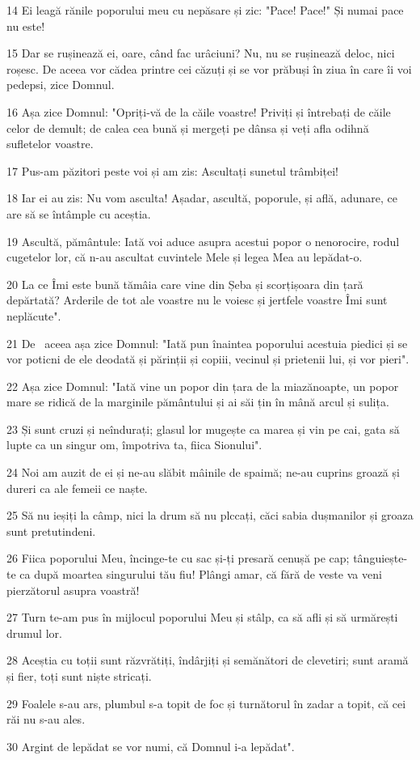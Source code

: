 \par 14 Ei leagă rănile poporului meu cu nepăsare și zic: "Pace! Pace!" Și numai pace nu este!
\par 15 Dar se rușinează ei, oare, când fac urâciuni? Nu, nu se rușinează deloc, nici roșesc. De aceea vor cădea printre cei căzuți și se vor prăbuși în ziua în care îi voi pedepsi, zice Domnul.
\par 16 Așa zice Domnul: "Opriți-vă de la căile voastre! Priviți și întrebați de căile celor de demult; de calea cea bună și mergeți pe dânsa și veți afla odihnă sufletelor voastre.
\par 17 Pus-am păzitori peste voi și am zis: Ascultați sunetul trâmbiței!
\par 18 Iar ei au zis: Nu vom asculta! Așadar, ascultă, poporule, și află, adunare, ce are să se întâmple cu aceștia.
\par 19 Ascultă, pământule: Iată voi aduce asupra acestui popor o nenorocire, rodul cugetelor lor, că n-au ascultat cuvintele Mele și legea Mea au lepădat-o.
\par 20 La ce Îmi este bună tămâia care vine din Șeba și scorțișoara din țară depărtată? Arderile de tot ale voastre nu le voiesc și jertfele voastre Îmi sunt neplăcute".
\par 21 De  aceea așa zice Domnul: "Iată pun înaintea poporului acestuia piedici și se vor poticni de ele deodată și părinții și copiii, vecinul și prietenii lui, și vor pieri".
\par 22 Așa zice Domnul: "Iată vine un popor din țara de la miazănoapte, un popor mare se ridică de la marginile pământului și ai săi țin în mână arcul și sulița.
\par 23 Și sunt cruzi și neîndurați; glasul lor mugește ca marea și vin pe cai, gata să lupte ca un singur om, împotriva ta, fiica Sionului".
\par 24 Noi am auzit de ei și ne-au slăbit mâinile de spaimă; ne-au cuprins groază și dureri ca ale femeii ce naște.
\par 25 Să nu ieșiți la câmp, nici la drum să nu plccați, căci sabia dușmanilor și groaza sunt pretutindeni.
\par 26 Fiica poporului Meu, încinge-te cu sac și-ți presară cenușă pe cap; tânguiește-te ca după moartea singurului tău fiu! Plângi amar, că fără de veste va veni pierzătorul asupra voastră!
\par 27 Turn te-am pus în mijlocul poporului Meu și stâlp, ca să afli și să urmărești drumul lor.
\par 28 Aceștia cu toții sunt răzvrătiți, îndârjiți și semănători de clevetiri; sunt aramă și fier, toți sunt niște stricați.
\par 29 Foalele s-au ars, plumbul s-a topit de foc și turnătorul în zadar a topit, că cei răi nu s-au ales.
\par 30 Argint de lepădat se vor numi, că Domnul i-a lepădat".

